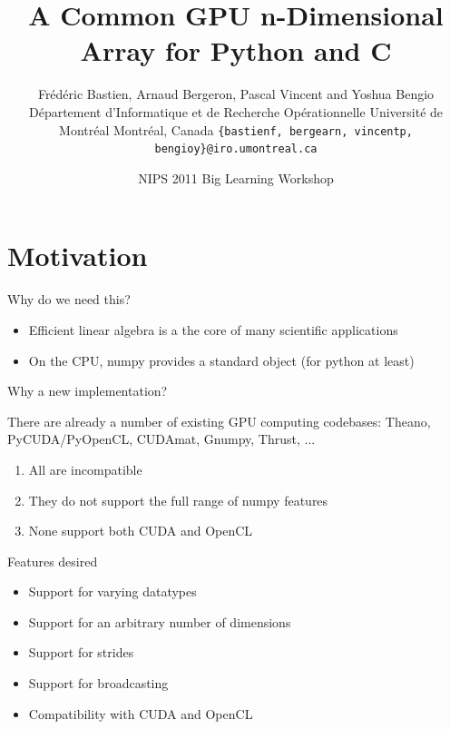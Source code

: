 \documentclass[utf8x,xcolor=pdftex,dvipsnames,table]{beamer}
\title{A Common GPU n-Dimensional Array for Python and C}
\author{
\footnotesize
Frédéric Bastien, Arnaud Bergeron, Pascal Vincent and Yoshua Bengio \newline
Département d'Informatique et de Recherche Opérationnelle \newline
Université de Montréal \newline
Montréal, Canada \newline
\texttt{\{bastienf, bergearn, vincentp, bengioy\}@iro.umontreal.ca}
}
\date{NIPS 2011 Big Learning Workshop}
\begin{document}
\begin{frame}[plain]
 \titlepage
\end{frame}
\addtocounter{framenumber}{-1}


\section{Motivation}

\begin{frame}{Why do we need this?}
\begin{itemize}
\item Efficient linear algebra is a the core of many scientific applications
\item On the CPU, numpy provides a standard object (for python at least)
\end{itemize}
\end{frame}

\begin{frame}{Why a new implementation?}
\begin{block}{There are already a number of existing GPU computing codebases:}
Theano, PyCUDA/PyOpenCL, CUDAmat, Gnumpy, Thrust, ...
\end {block}
\begin{enumerate}
\item<2-> All are incompatible
\item<3-> They do not support the full range of numpy features
\item<4-> None support both CUDA and OpenCL
\end{enumerate}
\end{frame}

\begin{frame}{Features desired}
\begin{itemize}
\item Support for varying datatypes
\item Support for an arbitrary number of dimensions
\item Support for strides
\item Support for broadcasting
\item Compatibility with CUDA and OpenCL
\end{itemize}
\end{frame}
\end{document}
